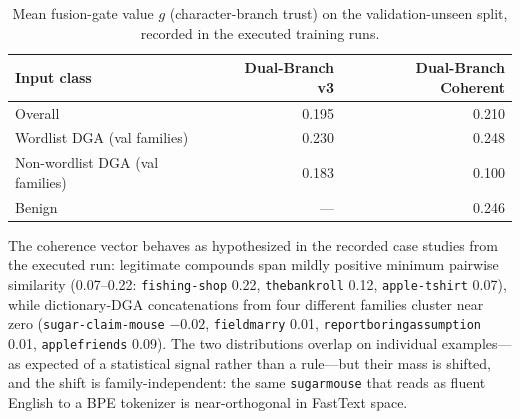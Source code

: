 \documentclass[conference]{IEEEtran}
\begin{document}
\begin{table}[t]
\centering
\caption{Mean fusion-gate value $g$ (character-branch trust) on the validation-unseen split, recorded in the executed training runs.}
\label{tab:gate}
\footnotesize
\setlength{\tabcolsep}{4pt}
\begin{tabular}{@{}lrr@{}}
\toprule
Input class & Dual-Branch v3 & Dual-Branch Coherent \\
\midrule
Overall & 0.195 & 0.210 \\
Wordlist DGA (val families) & 0.230 & 0.248 \\
Non-wordlist DGA (val families) & 0.183 & 0.100 \\
Benign & --- & 0.246 \\
\bottomrule
\end{tabular}
\end{table}

The coherence vector behaves as hypothesized in the recorded case studies from the executed run: legitimate compounds span mildly positive minimum pairwise similarity (0.07--0.22: \texttt{fishing-shop} 0.22, \texttt{thebankroll} 0.12, \texttt{apple-tshirt} 0.07), while dictionary-DGA concatenations from four different families cluster near zero (\texttt{sugar-claim-mouse} $-0.02$, \texttt{fieldmarry} 0.01, \texttt{reportboringassumption} 0.01, \texttt{applefriends} 0.09). The two distributions overlap on individual examples---as expected of a statistical signal rather than a rule---but their mass is shifted, and the shift is family-independent: the same \texttt{sugarmouse} that reads as fluent English to a BPE tokenizer is near-orthogonal in FastText space.
\end{document}
